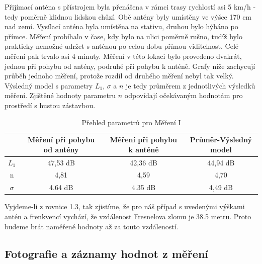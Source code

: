Přijímací anténa s přístrojem byla přenášena v rámci trasy rychlostí asi 5 km/h -tedy poměrně klidnou lidskou chůzí. Obě antény byly umístěny ve výšce 170 cm nad zemí. Vysílací anténa byla umístěna na stativu, druhou bylo hýbáno po přímce.  Měření probíhalo v čase, kdy bylo na ulici poměrně rušno, tudíž bylo prakticky nemožné udržet s anténou po celou dobu přímou viditelnost. Celé měření pak trvalo asi 4 minuty.
Měření v této lokaci bylo provedeno dvakrát, jednou při pohybu od antény, podruhé při pohybu k anténě.
Grafy níže zachycují průběh jednoho měření, protože rozdíl od druhého měření nebyl tak velký. Výsledný model s parametry  $L_1$,  $\sigma$ a $n$ je tedy průměrem z jednotlivých výsledků měření.
Zjištěné hodnoty parametru $n$ odpovídají očekávaným hodnotám pro prostředí s hustou zástavbou.

\begin{table}[h!]
\centering
\begin{tabular}{|c|c|c|c|}
  \hline
   & Měření při pohybu od antény & Měření při pohybu k anténě & Průměr-Výsledný model \\
  \hline
  $L_1$ & 47,53 dB & 42,36 dB & 44,94 dB\\
  \hline
  n & 4,81 & 4,59 & 4,70 \\
  \hline
  $\sigma$ & 4.64 dB & 4.35 dB & 4,49 dB\\
  \hline
\end{tabular}
\caption{Přehled parametrů pro Měření I}
\end{table}

Vyjdeme-li z rovnice 1.3, tak zjistíme, že pro náš případ s uvedenými výškami antén a frenkvencí vychází, že vzdálenost Fresnelova zlomu je 38.5 metru. Proto budeme brát naměřené hodnoty až za touto vzdáleností. 
\subsection{Fotografie a záznamy hodnot z měření}

